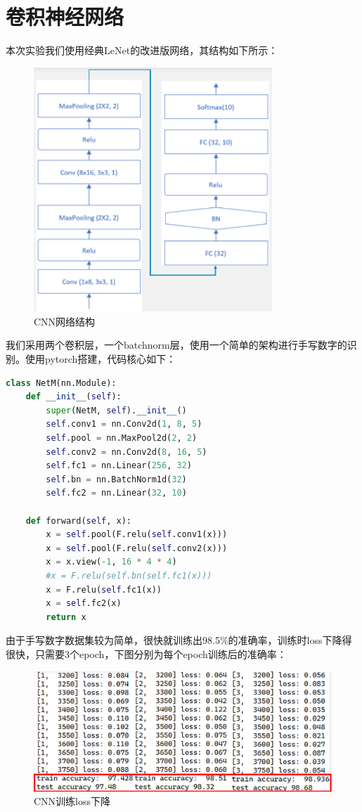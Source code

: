 \documentclass[withoutpreface,bwprint]{cumcmthesis} %
\begin{document}
\section{卷积神经网络}
本次实验我们使用经典LeNet的改进版网络，其结构如下所示：
\begin{figure}[H]
		\centering
		\includegraphics[width=0.8\textwidth]{CNN}
		\caption{CNN网络结构}
	\end{figure}
我们采用两个卷积层，一个batchnorm层，使用一个简单的架构进行手写数字的识别。使用pytorch搭建，代码核心如下：
\begin{lstlisting}[language=python]
class NetM(nn.Module):
    def __init__(self):
        super(NetM, self).__init__()
        self.conv1 = nn.Conv2d(1, 8, 5)
        self.pool = nn.MaxPool2d(2, 2)
        self.conv2 = nn.Conv2d(8, 16, 5)
        self.fc1 = nn.Linear(256, 32)
        self.bn = nn.BatchNorm1d(32)
        self.fc2 = nn.Linear(32, 10)

    def forward(self, x):
        x = self.pool(F.relu(self.conv1(x)))
        x = self.pool(F.relu(self.conv2(x)))
        x = x.view(-1, 16 * 4 * 4)
        #x = F.relu(self.bn(self.fc1(x)))
        x = F.relu(self.fc1(x))
        x = self.fc2(x)
        return x
\end{lstlisting}
由于手写数字数据集较为简单，很快就训练出98.5\%的准确率，训练时loss下降得很快，只需要3个epoch，下图分别为每个epoch训练后的准确率：
\begin{figure}[H]
		\centering
		\includegraphics[width=1\textwidth]{loss}
		\caption{CNN训练loss下降}
	\end{figure}
\end{document}
